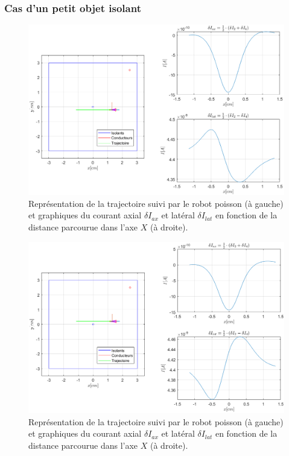 \subsubsection{Cas d'un petit objet isolant}
\begin{figure}[h!]
    \centering
    \includegraphics[width=\textwidth]{assets/plot_currents/Table1/isolant_bas.png}
    \caption{\centering Représentation de la trajectoire suivi par le robot poisson (à gauche) et graphiques du courant axial $\delta I_{ax}$ et latéral $\delta I_{lat}$ en fonction de la distance parcourue dans l'axe $X$ (à droite).}
    \label{fig:isolant_bas}
\end{figure}
\begin{figure}[h!]
    \centering
    \includegraphics[width=\textwidth]{assets/plot_currents/Table1/isolant_haut.png}
    \caption{\centering Représentation de la trajectoire suivi par le robot poisson (à gauche) et graphiques du courant axial $\delta I_{ax}$ et latéral $\delta I_{lat}$ en fonction de la distance parcourue dans l'axe $X$ (à droite).}
    \label{fig:isolant_haut}
\end{figure}

